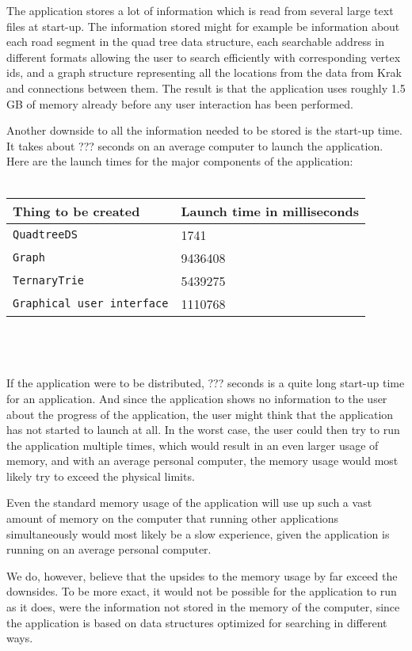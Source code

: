 The application stores a lot of information which is read from several large text files at start-up. The information stored might for example be information about each road segment in the quad tree data structure, each searchable address in different formats allowing the user to search efficiently with corresponding vertex ids, and a graph structure representing all the locations from the data from Krak and connections between them. The result is that the application uses roughly 1.5 GB of memory already before any user interaction has been performed.

Another downside to all the information needed to be stored is the start-up time. It takes about ??? seconds on an average computer to launch the application. Here are the launch times for the major components of the application: \\ \\
\begin{tabular}{ p{5cm} | p{3cm} }
	\textbf{Thing to be created} & \textbf{Launch time in milliseconds} \\
	\hline
	\texttt{QuadtreeDS} & 1741 \\
	\texttt{Graph} & 9436408 \\
	\texttt{TernaryTrie} & 5439275 \\
	\texttt{Graphical user interface} & 1110768
\end{tabular}
\\ \\ \\
If the application were to be distributed, ??? seconds is a quite long start-up time for an application. And since the application shows no information to the user about the progress of the application, the user might think that the application has not started to launch at all. In the worst case, the user could then try to run the application multiple times, which would result in an even larger usage of memory, and with an average personal computer, the memory usage would most likely try to exceed the physical limits.

Even the standard memory usage of the application will use up such a vast amount of memory on the computer that running other applications simultaneously would most likely be a slow experience, given the application is running on an average personal computer.

We do, however, believe that the upsides to the memory usage by far exceed the downsides. To be more exact, it would not be possible for the application to run as it does, were the information not stored in the memory of the computer, since the application is based on data structures optimized for searching in different ways.

